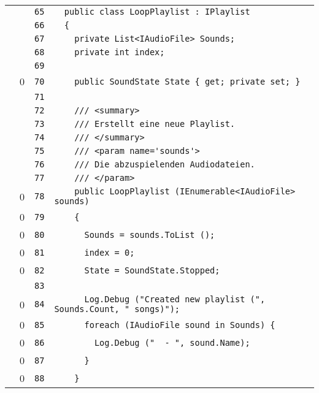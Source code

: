 \documentclass[a4paper,10pt]{article}
\begin{document}
\begin{longtable}[l]{lrrl}
\cellcolor{gray} &  & \verb~65~ & \verb~  public class LoopPlaylist : IPlaylist~\\
\cellcolor{gray} &  & \verb~66~ & \verb~  {~\\
\cellcolor{gray} &  & \verb~67~ & \verb~    private List<IAudioFile> Sounds;~\\
\cellcolor{gray} &  & \verb~68~ & \verb~    private int index;~\\
\cellcolor{gray} &  & \verb~69~ & \verb~~\\
\cellcolor{red} & 0 & \verb~70~ & \verb~    public SoundState State { get; private set; }~\\
\cellcolor{gray} &  & \verb~71~ & \verb~~\\
\cellcolor{gray} &  & \verb~72~ & \verb~    /// <summary>~\\
\cellcolor{gray} &  & \verb~73~ & \verb~    /// Erstellt eine neue Playlist.~\\
\cellcolor{gray} &  & \verb~74~ & \verb~    /// </summary>~\\
\cellcolor{gray} &  & \verb~75~ & \verb~    /// <param name='sounds'>~\\
\cellcolor{gray} &  & \verb~76~ & \verb~    /// Die abzuspielenden Audiodateien.~\\
\cellcolor{gray} &  & \verb~77~ & \verb~    /// </param>~\\
\cellcolor{red} & 0 & \verb~78~ & \verb~    public LoopPlaylist (IEnumerable<IAudioFile> sounds)~\\
\cellcolor{red} & 0 & \verb~79~ & \verb~    {~\\
\cellcolor{red} & 0 & \verb~80~ & \verb~      Sounds = sounds.ToList ();~\\
\cellcolor{red} & 0 & \verb~81~ & \verb~      index = 0;~\\
\cellcolor{red} & 0 & \verb~82~ & \verb~      State = SoundState.Stopped;~\\
\cellcolor{gray} &  & \verb~83~ & \verb~~\\
\cellcolor{red} & 0 & \verb~84~ & \verb~      Log.Debug ("Created new playlist (", Sounds.Count, " songs)");~\\
\cellcolor{red} & 0 & \verb~85~ & \verb~      foreach (IAudioFile sound in Sounds) {~\\
\cellcolor{red} & 0 & \verb~86~ & \verb~        Log.Debug ("  - ", sound.Name);~\\
\cellcolor{red} & 0 & \verb~87~ & \verb~      }~\\
\cellcolor{red} & 0 & \verb~88~ & \verb~    }~\\

\end{longtable}
\end{document}
